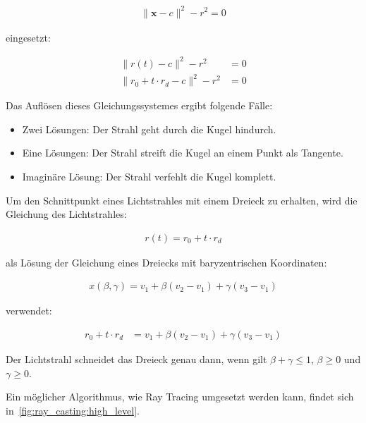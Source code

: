 \begin{gather}
    \|\bm{x} - c\|^{2} - r^{2} = 0
\end{gather}

eingesetzt:

\begin{align}
    \|r(t) - c\|^{2} - r^{2} &= 0 \\
    \|r_{0} + t \cdot r_{d} - c\|^{2} - r^{2} &= 0
\end{align}

Das Auflösen dieses Gleichungssystemes ergibt folgende Fälle:
\begin{itemize}
    \item{Zwei Lösungen}: Der Strahl geht durch die Kugel hindurch.
    \item{Eine Lösungen}: Der Strahl streift die Kugel an einem Punkt
        als Tangente.
    \item{Imaginäre Lösung}: Der Strahl verfehlt die Kugel komplett.
\end{itemize}

Um den Schnittpunkt eines Lichtstrahles mit einem Dreieck zu erhalten,
wird die Gleichung des Lichtstrahles:

\begin{gather}
    r(t) = r_{0} + t \cdot r_{d}
\end{gather}

als Lösung der Gleichung eines Dreiecks mit baryzentrischen Koordinaten:

\begin{gather}
    x(\beta, \gamma) = v_{1} + \beta(v_{2} - v_{1}) + \gamma(v_{3} - v_{1})
\end{gather}

verwendet:

\begin{align}
    r_{0} + t \cdot r_{d} &= v_{1} + \beta(v_{2} - v_{1}) + \gamma(v_{3} - v_{1})
\end{align}

Der Lichtstrahl schneidet das Dreieck genau dann, wenn gilt $\beta +
\gamma \le 1$, $\beta \ge 0$ und $\gamma \ge 0$.

Ein möglicher Algorithmus, wie Ray Tracing umgesetzt werden kann, findet
sich in~\ref{fig:ray_casting:high_level}.

